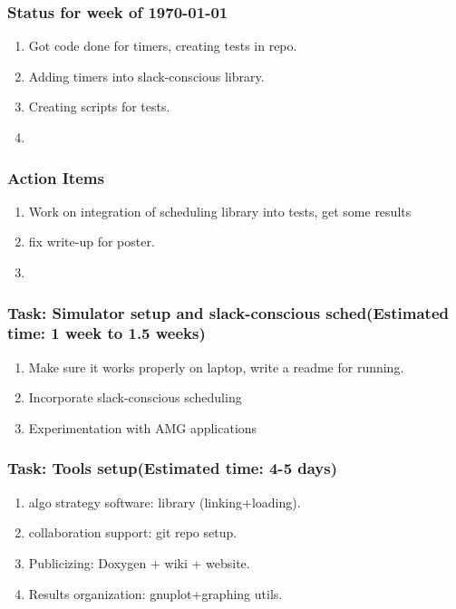 \begin{frame} [Status] 
\frametitle{Status for week of \today}
\begin{enumerate} 
\item Got code done for timers, creating tests in repo. 
\item Adding timers into slack-conscious library.
\item Creating scripts for tests. 
\item 
\end{enumerate}
\end{frame} 


\begin{frame}
\frametitle{Action Items}
\begin{enumerate}
\tiny \item \tiny Work on integration of scheduling library into tests,  get some results
\item \tiny fix write-up for poster. 
\item \tiny 
\end{enumerate} 
\end{frame}  

\begin{frame} [Tasks] 
\frametitle{Task: Simulator setup and slack-conscious sched(Estimated time: 1 week to 1.5 weeks)}
\begin{enumerate} 
\item Make sure it works properly on laptop, write a readme for running. 
\item Incorporate slack-conscious scheduling
\item Experimentation with AMG applications 
\end{enumerate}
\end{frame}  

\begin{frame} [Tasks] 
\frametitle{Task: Tools setup(Estimated time: 4-5 days)}
\begin{enumerate} 
\item algo strategy software: library (linking+loading). \\
\item collaboration support:  git repo setup. \\
\item Publicizing: Doxygen + wiki + website. \\
\item Results organization:  gnuplot+graphing utils. \\
\end{enumerate}
\end{frame}  

